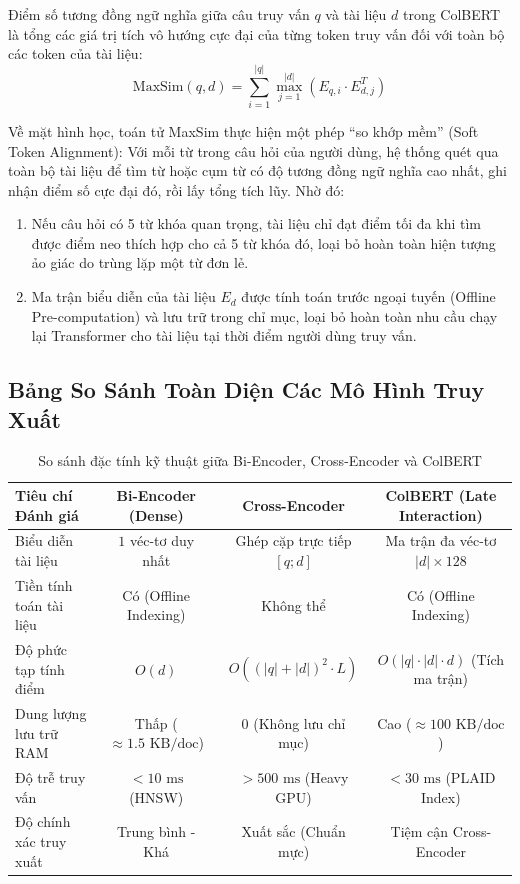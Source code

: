 \begin{definition}
Điểm số tương đồng ngữ nghĩa giữa câu truy vấn $q$ và tài liệu $d$ trong ColBERT là tổng các giá trị tích vô hướng cực đại của từng token truy vấn đối với toàn bộ các token của tài liệu:
\begin{equation}
\text{MaxSim}(q, d) = \sum_{i=1}^{|q|} \max_{j=1}^{|d|} \left( E_{q, i} \cdot E_{d, j}^T \right)
\end{equation}
\end{definition}

Về mặt hình học, toán tử MaxSim thực hiện một phép ``so khớp mềm'' (Soft Token Alignment): Với mỗi từ trong câu hỏi của người dùng, hệ thống quét qua toàn bộ tài liệu để tìm từ hoặc cụm từ có độ tương đồng ngữ nghĩa cao nhất, ghi nhận điểm số cực đại đó, rồi lấy tổng tích lũy. Nhờ đó:
\begin{enumerate}
  \item Nếu câu hỏi có 5 từ khóa quan trọng, tài liệu chỉ đạt điểm tối đa khi tìm được điểm neo thích hợp cho cả 5 từ khóa đó, loại bỏ hoàn toàn hiện tượng ảo giác do trùng lặp một từ đơn lẻ.
  \item Ma trận biểu diễn của tài liệu $E_d$ được tính toán trước ngoại tuyến (Offline Pre-computation) và lưu trữ trong chỉ mục, loại bỏ hoàn toàn nhu cầu chạy lại Transformer cho tài liệu tại thời điểm người dùng truy vấn.
\end{enumerate}

\subsection{Bảng So Sánh Toàn Diện Các Mô Hình Truy Xuất}
\begin{table}[htbp]
\centering
\small
\begin{tabular}{lccc}
\toprule
\textbf{Tiêu chí Đánh giá} & \textbf{Bi-Encoder (Dense)} & \textbf{Cross-Encoder} & \textbf{ColBERT (Late Interaction)} \\
\midrule
Biểu diễn tài liệu & $1$ véc-tơ duy nhất & Ghép cặp trực tiếp $[q; d]$ & Ma trận đa véc-tơ $|d| \times 128$ \\
Tiền tính toán tài liệu & Có (Offline Indexing) & Không thể & Có (Offline Indexing) \\
Độ phức tạp tính điểm & $O(d)$ & $O((|q|+|d|)^2 \cdot L)$ & $O(|q| \cdot |d| \cdot d)$ (Tích ma trận) \\
Dung lượng lưu trữ RAM & Thấp ($\approx 1.5\text{ KB/doc}$) & $0$ (Không lưu chỉ mục) & Cao ($\approx 100\text{ KB/doc}$) \\
Độ trễ truy vấn & $< 10\text{ ms}$ (HNSW) & $> 500\text{ ms}$ (Heavy GPU) & $< 30\text{ ms}$ (PLAID Index) \\
Độ chính xác truy xuất & Trung bình - Khá & Xuất sắc (Chuẩn mực) & Tiệm cận Cross-Encoder \\
\bottomrule
\end{tabular}
\caption{So sánh đặc tính kỹ thuật giữa Bi-Encoder, Cross-Encoder và ColBERT}
\label{tab:retrieval-comparison}
\end{table}

